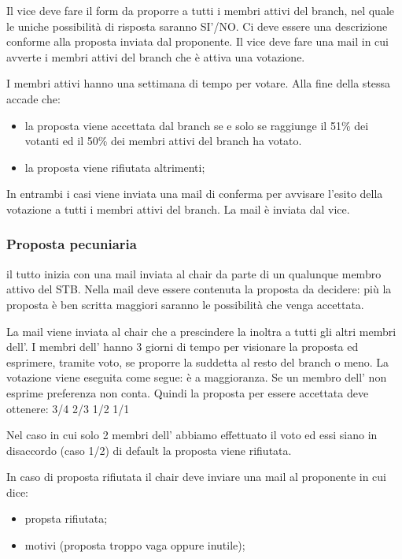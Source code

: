 \documentclass[pdf]{article}
\theoremstyle{definition}
\begin{document}
Il vice deve fare il form da proporre a tutti i membri attivi del branch, nel quale le uniche possibilità di risposta saranno SI'/NO. Ci deve essere una descrizione conforme alla proposta inviata dal proponente. 
Il vice deve fare una mail in cui avverte i membri attivi del branch che è attiva una votazione.

I membri attivi hanno una settimana di tempo per votare. Alla fine della stessa accade che:

\begin{itemize}
	\item la proposta viene accettata dal branch se e solo se raggiunge il 51\% dei votanti ed il 50\% dei membri attivi del branch ha votato.
	\item la proposta viene rifiutata altrimenti;
\end{itemize}

In entrambi i casi viene inviata una mail di conferma per  avvisare l'esito della votazione a tutti i membri attivi del branch. La mail è inviata dal vice.

\subsubsection{Proposta pecuniaria}

il tutto inizia con una mail inviata al chair da parte di un qualunque membro attivo del STB. Nella mail deve essere contenuta la proposta da decidere: più la proposta è ben scritta maggiori saranno le possibilità che venga accettata. 

La mail viene inviata al chair che a prescindere la inoltra a tutti gli altri membri dell'\EC{}. I membri dell'\EC{} hanno 3 giorni di tempo per visionare la proposta ed esprimere, tramite voto, se proporre la suddetta al resto del branch o meno.
La votazione viene eseguita come segue:
è a maggioranza. Se un membro dell'\EC{} non esprime preferenza non conta. Quindi la proposta per essere accettata deve ottenere:
3/4
2/3
1/2
1/1

Nel caso in cui solo 2 membri dell'\EC{} abbiamo effettuato il voto ed essi siano in disaccordo (caso 1/2) di default la proposta viene rifiutata.

In caso di proposta rifiutata il chair deve inviare una mail al proponente in cui dice:
\begin{itemize}
	\item propsta rifiutata;
	\item motivi (proposta troppo vaga oppure inutile);
\end{itemize}
\end{document}
